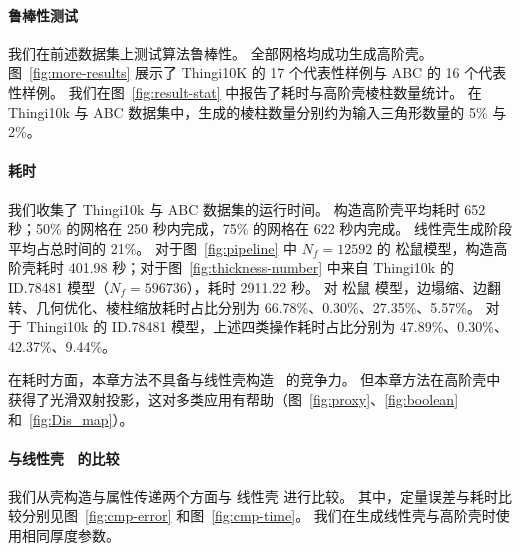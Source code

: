 \paragraph{鲁棒性测试}
我们在前述数据集上测试算法鲁棒性。
全部网格均成功生成高阶壳。
图~\ref{fig:more-results} 展示了 Thingi10K \cite{Zhou2016Thingi10KAD} 的 17 个代表性样例与 ABC \cite{Koch2018ABCAB} 的 16 个代表性样例。
我们在图~\ref{fig:result-stat} 中报告了耗时与高阶壳棱柱数量统计。
在 Thingi10k 与 ABC 数据集中，生成的棱柱数量分别约为输入三角形数量的 5\% 与 2\%。

\paragraph{耗时}


我们收集了 Thingi10k 与 ABC 数据集的运行时间。
构造高阶壳平均耗时 652 秒；50\% 的网格在 250 秒内完成，75\% 的网格在 622 秒内完成。
线性壳生成阶段平均占总时间的 21\%。
%
对于图~\ref{fig:pipeline} 中 $N_f=12592$ 的 松鼠模型，构造高阶壳耗时 401.98 秒；对于图~\ref{fig:thickness-number} 中来自 Thingi10k 的 ID.78481 模型（$N_f=596736$），耗时 2911.22 秒。
对 松鼠 模型，边塌缩、边翻转、几何优化、棱柱缩放耗时占比分别为 66.78\%、0.30\%、27.35\%、5.57\%。
对于 Thingi10k 的 ID.78481 模型，上述四类操作耗时占比分别为 47.89\%、0.30\%、42.37\%、9.44\%。

在耗时方面，本章方法不具备与线性壳构造~\cite{Jiang2020BijectivePI} 的竞争力。
但本章方法在高阶壳中获得了光滑双射投影，这对多类应用有帮助（图~\ref{fig:proxy}、\ref{fig:boolean} 和~\ref{fig:Dis_map}）。

\paragraph{与线性壳~\cite{Jiang2020BijectivePI} 的比较}
我们从壳构造与属性传递两个方面与 线性壳 进行比较。
其中，定量误差与耗时比较分别见图~\ref{fig:cmp-error} 和图~\ref{fig:cmp-time}。
%
我们在生成线性壳与高阶壳时使用相同厚度参数。

